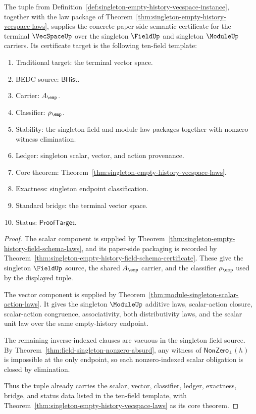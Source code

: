 \begin{theorem}
\label{thm:singleton-empty-history-vecspace-semantic-certificate}
The tuple from
Definition~\ref{def:singleton-empty-history-vecspace-instance}, together with
the law package of Theorem~\ref{thm:singleton-empty-history-vecspace-laws},
supplies the concrete paper-side semantic certificate for the terminal
$\VecSpaceUp$ over the singleton $\FieldUp$ and singleton $\ModuleUp$ carriers.
Its certificate target is the following ten-field template:
\begin{enumerate}
  \item Traditional target: the terminal vector space.
  \item BEDC source: $\mathsf{BHist}$.
  \item Carrier: $A_{\emp}$.
  \item Classifier: $\rho_{\emp}$.
  \item Stability: the singleton field and module law packages together with
  nonzero-witness elimination.
  \item Ledger: singleton scalar, vector, and action provenance.
  \item Core theorem:
  Theorem~\ref{thm:singleton-empty-history-vecspace-laws}.
  \item Exactness: singleton endpoint classification.
  \item Standard bridge: the terminal vector space.
  \item Status: $\mathsf{ProofTarget}$.
\end{enumerate}
\end{theorem}
\begin{proof}
The scalar component is supplied by
Theorem~\ref{thm:singleton-empty-history-field-schema-laws}, and its
paper-side packaging is recorded by
Theorem~\ref{thm:singleton-empty-history-field-schema-certificate}. These give
the singleton $\FieldUp$ source, the shared $A_{\emp}$ carrier, and the
classifier $\rho_{\emp}$ used by the displayed tuple.

The vector component is supplied by
Theorem~\ref{thm:module-singleton-scalar-action-laws}. It gives the singleton
$\ModuleUp$ additive laws, scalar-action closure, scalar-action congruence,
associativity, both distributivity laws, and the scalar unit law over the same
empty-history endpoint.

The remaining inverse-indexed clauses are vacuous in the singleton field
source. By Theorem~\ref{thm:field-singleton-nonzero-absurd}, any witness of
$\mathsf{NonZero}_{\bot}(h)$ is impossible at the only endpoint, so each
nonzero-indexed scalar obligation is closed by elimination.

Thus the tuple already carries the scalar, vector, classifier, ledger,
exactness, bridge, and status data listed in the ten-field template, with
Theorem~\ref{thm:singleton-empty-history-vecspace-laws} as its core theorem.
\end{proof}

